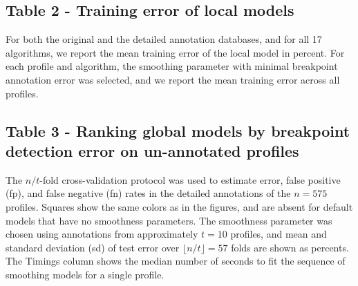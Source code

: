 \documentclass[10pt]{bmc_article}
\newenvironment{bmcformat}{\begin{raggedright}\baselineskip20pt\sloppy\setboolean{publ}{false}}{\end{raggedright}\baselineskip20pt\sloppy}
\begin{document}
\begin{bmcformat}
\subsection*{Table 2 - Training error of local models}

\begin{center}
  
\end{center}

For both the original and the detailed annotation databases, and for
all 17 algorithms, we report the mean training error of the local
model in percent. For each profile and algorithm, the smoothing
parameter with minimal breakpoint annotation error was selected, and
we report the mean training error across all profiles.

\newpage

\subsection*{Table 3 - Ranking global models by breakpoint detection
  error on un-annotated profiles}
%
\begin{center}
  
\end{center}

The $n/t$-fold cross-validation protocol was used to estimate error,
false positive (fp), and false negative (fn) rates in the detailed
annotations of the $n=575$ profiles. Squares show the same colors as
in the figures, and are absent for default models that have no
smoothness parameters. The smoothness parameter was chosen using
annotations from approximately $t=10$ profiles, and mean and standard
deviation (sd) of test error over $\lfloor n/t\rfloor =57$ folds are
shown as percents. The Timings column shows the median number of
seconds to fit the sequence of smoothing models for a single profile.




\end{bmcformat}
\end{document}
